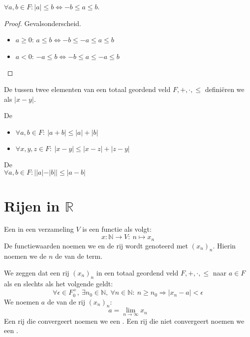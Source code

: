 \documentclass[main.tex]{subfiles}
\begin{document}
\begin{pr}
  $\forall a,b\in F: |a| \le b \Leftrightarrow -b \le a \le b$.

  \begin{proof}
    Gevalsonderscheid.
    \begin{itemize}
    \item $a \ge 0$: $a \le b \Leftrightarrow -b \le -a \le a \le b$
    \item $a <0$: $-a \le b \Leftrightarrow -b \le a \le -a \le b$
    \end{itemize}
  \end{proof}
\end{pr}

\begin{de}
  De  tussen twee elementen van een totaal geordend veld $F,+,\cdot,\le$ defini\"eren we als $|x-y|$.
\end{de}

\begin{pr}
  De \\
  \begin{itemize}
  \item $\forall a,b\in F:\ |a+b| \le |a| + |b|$
  \item $\forall x,y,z\in F:\ |x-y| \le |x-z| + |z-y|$
  \end{itemize}
\end{pr}

\begin{pr}
  De \\
  $\forall a,b\in F: ||a|-|b|| \le |a-b|$
\end{pr}

\section{Rijen in $\mathbb{R}$}
\label{sec:rijen-mathbbr}

\begin{de}
  Een  in een verzameling $V$ is een functie als volgt:
  \[ x: \mathbb{N} \rightarrow V:\ n\mapsto x_{n} \]
  De functiewaarden noemen we  en de rij wordt genoteerd met $(x_{n})_{n}$.
  Hierin noemen we de $n$ de  van de term.
\end{de}

\begin{de}
  We zeggen dat een rij $(x_{n})_{n}$ in een totaal geordend veld $F,+,\cdot,\le$  naar $a\in F$ als en slechts als het volgende geldt:
  \[ \forall \epsilon \in F_{0}^{+},\ \exists n_{0}\in \mathbb{N},\ \forall n\in \mathbb{N}:\ n \ge n_{0} \Rightarrow |x_{n}-a| < \epsilon \]
  We noemen $a$ de  van de rij $(x_{n})_{n}$:
  \[ a = \lim_{n\rightarrow \infty}x_{n} \]
  Een rij die convergeert noemen we een .
  Een rij die niet convergeert noemen we een .
\end{de}
\end{document}
